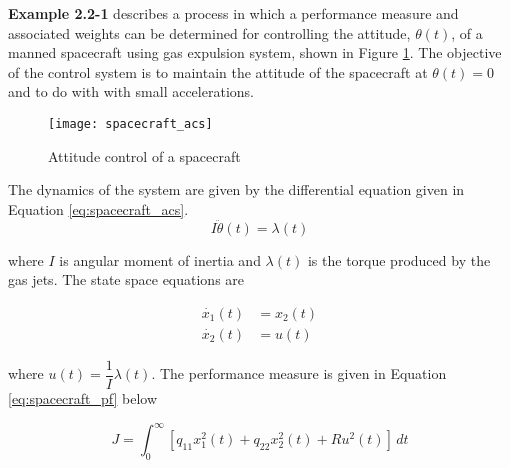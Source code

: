 
\begin{question}{1}
\end{question}
\textbf{Example 2.2-1} describes a process in which a performance measure and
associated weights can be determined for controlling the attitude, $\theta(t)$,
of a manned spacecraft using gas expulsion system, shown in Figure \ref{fig:spacecraft_acs}.
The objective of the control system is to maintain the attitude of the
spacecraft at $\theta(t) = 0$ and to do with with small accelerations.

\begin{figure}[h]
    \texttt{[image: spacecraft\_acs]}
    \centering
    \caption{Attitude control of a spacecraft \cite{kirkdover}}
    \label{fig:spacecraft_acs}
\end{figure}

The dynamics of the system are given by the differential equation given in
Equation \ref{eq:spacecraft_acs}. 
\begin{equation}
    I \ddot{\theta}(t) = \lambda(t) \label{eq:spacecraft_acs}
\end{equation}

\noindent where $I$ is angular moment of inertia and $\lambda(t)$ is the
torque produced by the gas jets. The state space equations are

\begin{align}
    \dot{x_1}(t) &= x_2 (t) \label{eq:sc_ssr_s1} \\
    \dot{x_2}(t) &= u (t) \label{eq:sc_ssr_x2}
\end{align}

\noindent where $u(t) = \dfrac{1}{I} \lambda(t)$. The performance measure is 
given in Equation \ref{eq:spacecraft_pf} below

\begin{equation}
    J = \int_{0}^{\infty} [q_{11} x_1^2(t) + q_{22} x_2^2(t) + R u^2 (t)] \, dt
    \label{eq:spacecraft_pf}
\end{equation}



